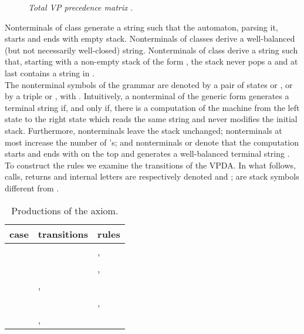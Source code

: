 \documentclass[3p,11pt]{elsarticle}
\begin{document}
\begin{figure}[h]
\begin{center}

\end{center}
\caption{\label{figureTotalVPmatr}\emph{Total VP precedence matrix} . }
\end{figure}
Nonterminals of class  generate a string such that the automaton, parsing it, starts and ends with empty stack. Nonterminals of classes  derive a well-balanced (but not necessarily well-closed) string. Nonterminals of class  derive a string such that, starting with a non-empty stack of the form , the stack never pops a  and at last contains a string in .
\\
The nonterminal symbols of the grammar are denoted  by a pair of states  or , or by a triple  or , with . Intuitively, a nonterminal of the generic form  generates a terminal string  if, and only if, there is a computation of the machine from the left state  to the right state   which reads the same string and never modifies the initial stack. Furthermore, nonterminals  leave the stack unchanged; nonterminals  at most increase the number of 's; and nonterminals  or  denote that the computation starts and ends with  on the top and generates a well-balanced terminal string .
\\
To construct the rules we examine the transitions of the  VPDA. In what follows, calls, returns and internal letters are respectively denoted  and ;  are stack symbols different from .
\begin{table}[h!]
\caption{\label{productionsS}Productions of the axiom. }
\renewcommand{\arraystretch}{1.3}
\begin{tabular}{l|p{5cm}|p{6cm}}
  case & transitions  & rules \\
  \hline
  &  &   ,  \\

      &   &  ,   \\

       & , &    \\

        &  &  ,  \\

      & ,  &  \\
  \hline
\end{tabular}
\end{table}
\end{document}
